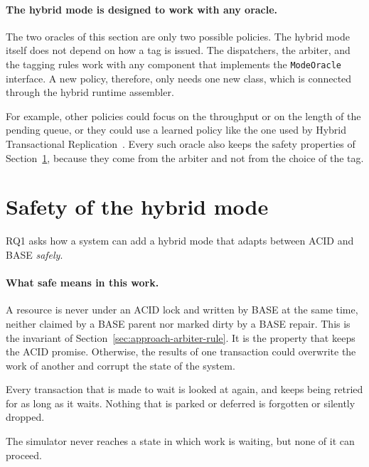 \paragraph{The hybrid mode is designed to work with any
  oracle.}\label{sec:approach-other-oracles} The two oracles of this section are
only two possible policies. The hybrid mode itself does not depend on how a tag
is issued. The dispatchers, the arbiter, and the tagging rules work with any
component that implements the \texttt{ModeOracle} interface. A new policy,
therefore, only needs one new class, which is connected through the hybrid
runtime assembler.

For example, other policies could focus on the throughput or on the length of
the pending queue, or they could use a learned policy like the one used by
Hybrid Transactional Replication~\cite{kobus2018htr}. Every such oracle
also keeps the safety properties of Section~\ref{sec:approach-deadlock}, because
they come from the arbiter and not from the choice of the tag.

\section{Safety of the hybrid mode}\label{sec:approach-deadlock}

RQ1 asks how a system can add a hybrid mode that adapts between ACID and
BASE \emph{safely}.

\paragraph{What safe means in this
  work.}\label{sec:approach-safety-what}

\begin{bullets}
  \item[S1. Transactions never corrupt each other's work.] A resource is never
  under an ACID lock and written by BASE at the same time, neither claimed by
  a BASE parent nor marked dirty by a BASE repair. This is the
  invariant of Section~\ref{sec:approach-arbiter-rule}. It is the property that
  keeps the ACID promise. Otherwise, the results of one transaction could
  overwrite the work of another and corrupt the state of the system.

  \item[S2. No work is dismissed or forgotten.] Every transaction that is made
  to wait is looked at again, and keeps being retried for as long as it
  waits. Nothing that is
  parked or deferred is forgotten or silently dropped.

  \item[S3. Every run is free of deadlock.] The simulator never reaches a state
  in which work is waiting, but none of it can proceed.
\end{bullets}

